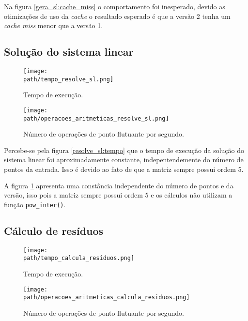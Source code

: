 \documentclass[a4paper, 11pt]{article}
\begin{document}
Na figura \ref{gera_sl:cache_miss} o comportamento foi inesperado, devido as otimizações de uso da \textit{cache} o resultado esperado é que a versão 2 tenha um \textit{cache miss} menor que a versão 1.

\subsection{Solução do sistema linear}
\begin{figure}[H]
    \centering
    \begin{minipage}{.5\textwidth}
        \centering
        \texttt{[image: \\path/tempo\_resolve\_sl.png]}
        \caption{Tempo de execução.}
        \label{resolve_sl:tempo}
    \end{minipage}\hfill
    \begin{minipage}{.5\textwidth}
        \centering
        \texttt{[image: \\path/operacoes\_aritmeticas\_resolve\_sl.png]}
        \caption{Número de operações de ponto flutuante por segundo.}
        \label{resolve_sl:flops}
    \end{minipage}
\end{figure}

Percebe-se pela figura \ref{resolve_sl:tempo} que o tempo de execução da
solução do sistema linear foi aproximadamente constante, indepentendemente
do número de pontos da entrada. Isso é devido ao fato de que a matriz sempre
possui ordem 5.

A figura \ref{resolve_sl:flops} apresenta uma constância independente do número de pontos e da versão, isso pois a matriz sempre possui ordem 5 e os cálculos não utilizam a função \texttt{pow\_inter()}.

\subsection{Cálculo de resíduos}
\begin{figure}[H]
    \centering
    \begin{minipage}{.5\textwidth}
        \centering
        \texttt{[image: \\path/tempo\_calcula\_residuos.png]}
        \caption{Tempo de execução.}
        \label{calcula_residuos:tempo}
    \end{minipage}\hfill
    \begin{minipage}{.5\textwidth}
        \centering
        \texttt{[image: \\path/operacoes\_aritmeticas\_calcula\_residuos.png]}
        \caption{Número de operações de ponto flutuante por segundo.}
        \label{calcula_residuos:flops}
    \end{minipage}
\end{figure}
\end{document}

